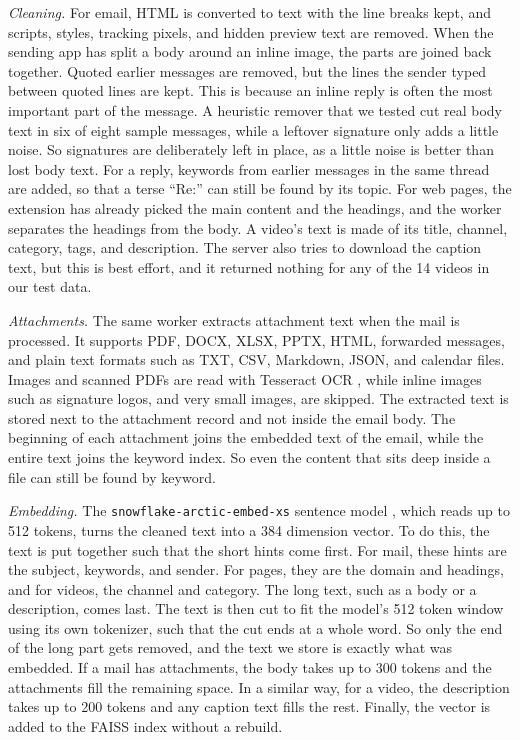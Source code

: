 \documentclass[conference]{IEEEtran}
\newcommand{\embmodel}{\texttt{snowflake\allowbreak-arctic\allowbreak-embed\allowbreak-xs}}
\begin{document}
\textit{Cleaning.} For email, HTML is converted to text with the line breaks kept, and scripts, styles, tracking pixels, and hidden preview text are removed. When the sending app has split a body around an inline image, the parts are joined back together. Quoted earlier messages are removed, but the lines the sender typed between quoted lines are kept. This is because an inline reply is often the most important part of the message. A heuristic remover that we tested cut real body text in six of eight sample messages, while a leftover signature only adds a little noise. So signatures are deliberately left in place, as a little noise is better than lost body text. For a reply, keywords from earlier messages in the same thread are added, so that a terse ``Re:'' can still be found by its topic. For web pages, the extension has already picked the main content and the headings, and the worker separates the headings from the body. A video's text is made of its title, channel, category, tags, and description. The server also tries to download the caption text, but this is best effort, and it returned nothing for any of the 14 videos in our test data.

\textit{Attachments.} The same worker extracts attachment text when the mail is processed. It supports PDF, DOCX, XLSX, PPTX, HTML, forwarded messages, and plain text formats such as TXT, CSV, Markdown, JSON, and calendar files. Images and scanned PDFs are read with Tesseract OCR \cite{b15}, while inline images such as signature logos, and very small images, are skipped. The extracted text is stored next to the attachment record and not inside the email body. The beginning of each attachment joins the embedded text of the email, while the entire text joins the keyword index. So even the content that sits deep inside a file can still be found by keyword.

\textit{Embedding.} The \embmodel{} sentence model \cite{b16}, which reads up to 512 tokens, turns the cleaned text into a 384 dimension vector. To do this, the text is put together such that the short hints come first. For mail, these hints are the subject, keywords, and sender. For pages, they are the domain and headings, and for videos, the channel and category. The long text, such as a body or a description, comes last. The text is then cut to fit the model's 512 token window using its own tokenizer, such that the cut ends at a whole word. So only the end of the long part gets removed, and the text we store is exactly what was embedded. If a mail has attachments, the body takes up to 300 tokens and the attachments fill the remaining space. In a similar way, for a video, the description takes up to 200 tokens and any caption text fills the rest. Finally, the vector is added to the FAISS index without a rebuild.
\end{document}
